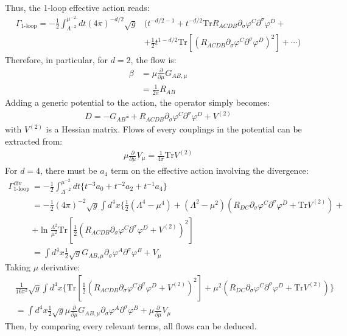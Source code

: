 \documentclass[fleqn]{article}
\begin{document}
Thus, the 1-loop effective action reads:
\begin{align}
\Gamma _{\text{1-loop}} = -\frac{1}{2} \int _{\Lambda ^{-2}}^{\mu ^{-2}} dt (4\pi)^{-d/2} \sqrt{g} &(t^{-d/2 -1} + t^{-d/2}\text{Tr} R_{ACDB} \partial _{\sigma} \varphi ^{C} \partial ^{\sigma} \varphi ^{D} + \nonumber \\
&+\frac{1}{2}t^{1-d/2}\text{Tr}[(R_{ACDB} \partial _{\sigma} \varphi ^{C} \partial ^{\sigma} \varphi ^{D})^2] + \cdots  )  
\end{align}
Therefore, in particular, for $d=2$, the flow is:
\begin{align}
\beta &= \mu \frac{\partial} {\partial \mu} G_{AB,\mu} \nonumber \\
&= \frac{1}{2\pi} R_{AB} 
\end{align}
Adding a generic potential to the action, the operator simply becomes:
\begin{align}
D = -G_{AB}\square + R_{ACDB} \partial _{\sigma} \varphi^{C} \partial ^{\sigma} \varphi ^{D} + V^{(2)}
\end{align}
with $V^{(2)}$ is a Hessian matrix. Flows of every couplings in the potential can be extracted from:
\begin{align}
\mu \frac{\partial}{\partial \mu} V_{\mu} = \frac{1}{4\pi} \text{Tr} V^{(2)}
\end{align}
For $d=4$, there must be $a_4$ term on the effective action involving the divergence:
\begin{align}
\Gamma_{\text{1-loop}} ^{\text{div}} &= -\frac{1}{2} \int _{\Lambda ^{-2}} ^{\mu ^{-2}} dt \lbrace t^{-3} a_0 + t^{-2}a_2 + t^{-1} a_4 \rbrace \nonumber \\
&= -\frac{1}{2} (4\pi)^{-2} \sqrt{g}\int d^{4}x \lbrace \frac{1}{2} (\Lambda ^{4} - \mu ^{4}) + (\Lambda ^{2} - \mu ^{2}) (R_{DC} \partial _{\sigma} \varphi ^{C} \partial ^{\sigma} \varphi ^{D} + \text{Tr}V^{(2)}) +\nonumber \\
&+\ln \frac{\Lambda ^{2}}{\mu^2} \text{Tr} [\frac{1}{2}(R_{ACDB} \partial _{\sigma} \varphi ^{C} \partial ^{\sigma} \varphi ^{D} + V^{(2)} )^{2}] \\
&= \int d^{4}x \frac{1}{2}\sqrt{g} G_{AB,\mu} \partial _{\sigma} \varphi^{A} \partial ^{\sigma} \varphi ^{B} + V_{\mu}
\end{align}
Taking $\mu$ derivative:
\begin{align}
&\frac{1}{16\pi ^{2}} \sqrt{g} \int d^{4}x \lbrace \text{Tr} [\frac{1}{2}(R_{ACDB} \partial _{\sigma} \varphi ^{C} \partial ^{\sigma} \varphi ^{D} + V^{(2)} )^{2}] + \mu ^{2}  (R_{DC} \partial _{\sigma} \varphi ^{C} \partial ^{\sigma} \varphi ^{D} + \text{Tr}V^{(2)}) \rbrace \nonumber \\
&= \int d^{4}x \frac{1}{2} \sqrt{g} \mu \frac{\partial}{\partial \mu} G_{AB,\mu} \partial _{\sigma}\varphi^{A} \partial ^{\sigma} \varphi ^{B} + \mu \frac{\partial}{\partial \mu} V_{\mu} 
\end{align}
Then, by comparing every relevant terms, all flows can be deduced.
\end{document}
